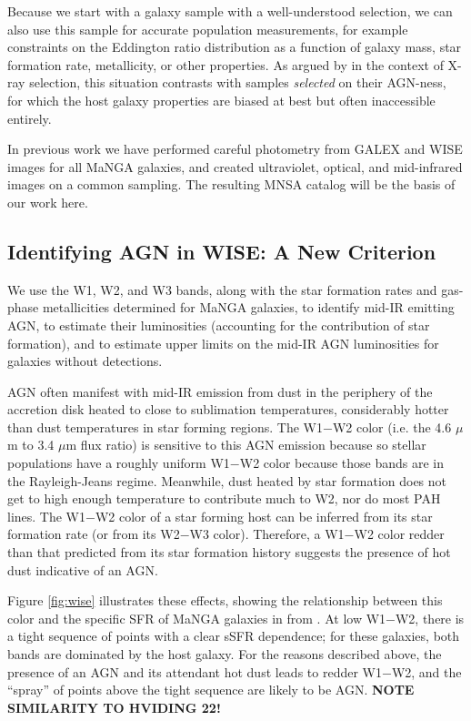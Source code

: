 \documentclass[12pt, preprint]{hacked-aastex}
\begin{document}
Because we start with a galaxy sample with a well-understood
selection, we can also use this sample for accurate population
measurements, for example constraints on the Eddington ratio
distribution as a function of galaxy mass, star formation rate,
metallicity, or other properties.  As argued by \cite{aird12a} in the
context of X-ray selection, this situation contrasts with samples {\it
  selected} on their AGN-ness, for which the host galaxy properties
are biased at best but often inaccessible entirely.

In previous work we have performed careful photometry from GALEX and
WISE images for all MaNGA galaxies, and created ultraviolet, optical,
and mid-infrared images on a common sampling. The resulting MNSA
catalog will be the basis of our work here.

\subsection{Identifying AGN in WISE: A New Criterion}
\label{sec:criterion}

We use the W1, W2, and W3 bands, along with the star formation rates
and gas-phase metallicities determined for MaNGA galaxies, to identify
mid-IR emitting AGN, to estimate their luminosities (accounting for
the contribution of star formation), and to estimate upper limits on
the mid-IR AGN luminosities for galaxies without detections.

AGN often manifest with mid-IR emission from dust in the periphery of
the accretion disk heated to close to sublimation temperatures,
considerably hotter than dust temperatures in star forming regions.
The W1$-$W2 color (i.e. the 4.6 $\mu$m to 3.4 $\mu$m flux ratio) is
sensitive to this AGN emission because so stellar populations have a
roughly uniform W1$-$W2 color because those bands are in the
Rayleigh-Jeans regime.  Meanwhile, dust heated by star formation does
not get to high enough temperature to contribute much to W2, nor do
most PAH lines.  The W1$-$W2 color of a star forming host can be
inferred from its star formation rate (or from its W2$-$W3 color).
Therefore, a W1$-$W2 color redder than that predicted from its star
formation history suggests the presence of hot dust indicative of an
AGN.

Figure \ref{fig:wise} illustrates these effects, showing the
relationship between this color and the specific SFR of MaNGA galaxies
in from \cite{sanchez22a}.  At low W1$-$W2, there is a tight sequence
of points with a clear sSFR dependence; for these galaxies, both bands
are dominated by the host galaxy.  For the reasons described above,
the presence of an AGN and its attendant hot dust leads to redder
W1$-$W2, and the ``spray'' of points above the tight sequence are
likely to be AGN.  {\bf NOTE SIMILARITY TO HVIDING 22!}
\end{document}
